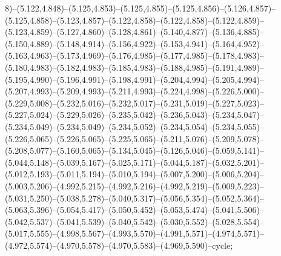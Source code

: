 8)--(5.122,4.848)--(5.125,4.853)--(5.125,4.855)--(5.125,4.856)--(5.126,4.857)--(5.125,4.858)--(5.123,4.857)--(5.122,4.858)--(5.122,4.858)--(5.122,4.859)--(5.123,4.859)--(5.127,4.860)--(5.128,4.861)--(5.140,4.877)--(5.136,4.885)--(5.150,4.889)--(5.148,4.914)--(5.156,4.922)--(5.153,4.941)--(5.164,4.952)--(5.163,4.963)--(5.173,4.969)--(5.176,4.985)--(5.177,4.985)--(5.178,4.983)--(5.180,4.983)--(5.182,4.983)--(5.185,4.983)--(5.188,4.985)--(5.191,4.989)--(5.195,4.990)--(5.196,4.991)--(5.198,4.991)--(5.204,4.994)--(5.205,4.994)--(5.207,4.993)--(5.209,4.993)--(5.211,4.993)--(5.224,4.998)--(5.226,5.000)--(5.229,5.008)--(5.232,5.016)--(5.232,5.017)--(5.231,5.019)--(5.227,5.023)--(5.227,5.024)--(5.229,5.026)--(5.235,5.042)--(5.236,5.043)--(5.234,5.047)--(5.234,5.049)--(5.234,5.049)--(5.234,5.052)--(5.234,5.054)--(5.234,5.055)--(5.226,5.065)--(5.226,5.065)--(5.225,5.065)--(5.211,5.076)--(5.209,5.078)--(5.208,5.077)--(5.160,5.065)--(5.134,5.045)--(5.126,5.046)--(5.059,5.141)--(5.044,5.148)--(5.039,5.167)--(5.025,5.171)--(5.044,5.187)--(5.032,5.201)--(5.012,5.193)--(5.011,5.194)--(5.010,5.194)--(5.007,5.200)--(5.006,5.204)--(5.003,5.206)--(4.992,5.215)--(4.992,5.216)--(4.992,5.219)--(5.009,5.223)--(5.031,5.250)--(5.038,5.278)--(5.040,5.317)--(5.056,5.354)--(5.052,5.364)--(5.063,5.396)--(5.054,5.417)--(5.050,5.452)--(5.053,5.474)--(5.041,5.506)--(5.042,5.537)--(5.041,5.539)--(5.040,5.542)--(5.030,5.552)--(5.028,5.554)--(5.017,5.555)--(4.998,5.567)--(4.993,5.570)--(4.991,5.571)--(4.974,5.571)--(4.972,5.574)--(4.970,5.578)--(4.970,5.583)--(4.969,5.590)--cycle;
